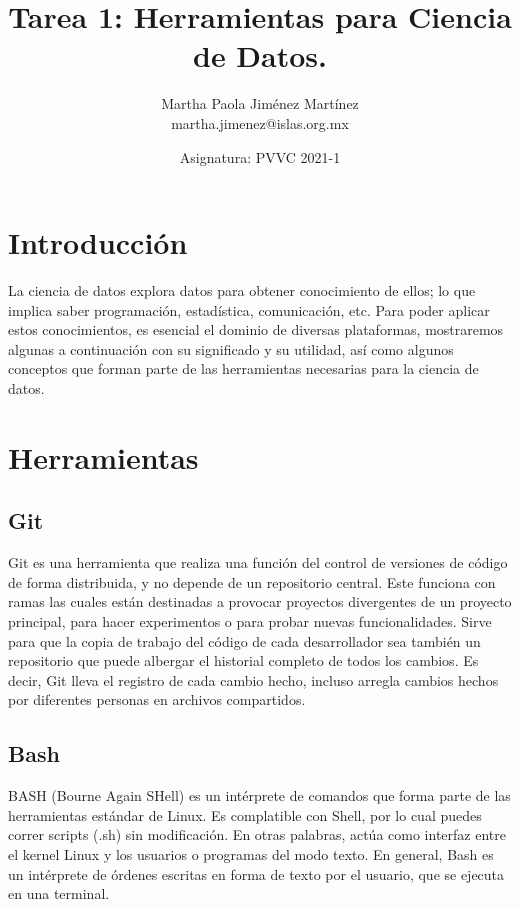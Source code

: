 \documentclass[12pt,letterpaper]{article}
\begin{document}
\title{\textbf{Tarea 1: Herramientas para Ciencia de Datos.}} \author{Martha Paola Jiménez Martínez
\\
\small{martha.jimenez@islas.org.mx}}
\date{ \small{Asignatura: PVVC 2021-1}
} 
\maketitle


\section*{Introducción}
La ciencia de datos explora datos para obtener conocimiento de ellos; lo que implica saber
programación, estadística, comunicación, etc. Para poder aplicar estos conocimientos, es esencial el
dominio de diversas plataformas, mostraremos algunas a continuación con su significado y su
utilidad, así como algunos conceptos que forman parte de las herramientas necesarias para la ciencia
de datos.

\section*{Herramientas}
\subsection*{Git}
Git es una herramienta que realiza una función del control de versiones de código de forma
distribuida, y no depende de un repositorio central. Este funciona con ramas las cuales están
destinadas a provocar proyectos divergentes de un proyecto principal, para hacer experimentos o para
probar nuevas funcionalidades.
\citep{rubio_2020}
Sirve para que la copia de trabajo del código de cada desarrollador sea también un repositorio que
puede albergar el historial completo de todos los cambios.
\citep{bitbucket_git}
Es decir, Git lleva el registro de cada cambio hecho, incluso arregla cambios hechos por diferentes personas en archivos compartidos.

\subsection*{Bash}
BASH (Bourne Again SHell) es un intérprete de comandos que forma parte de las herramientas estándar
de Linux. Es complatible con Shell, por lo cual puedes correr scripts (.sh) sin modificación. En
otras palabras, actúa como interfaz entre el kernel Linux y los usuarios o programas del modo texto.
\citep{canepa_2018}
En general, Bash es un intérprete de órdenes escritas en forma de texto por el usuario, que se ejecuta en una terminal.
\end{document}

